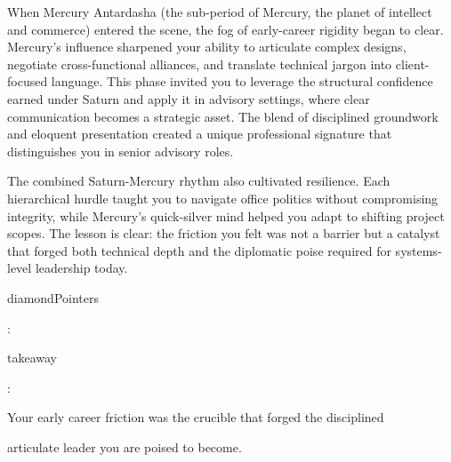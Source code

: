 {\fontsize{9}{13}\selectfont When Mercury Antardasha (the sub-period of Mercury, the planet of intellect and commerce) entered the scene, the fog of early-career rigidity began to clear. Mercury's influence sharpened your ability to articulate complex designs, negotiate cross-functional alliances, and translate technical jargon into client-focused language. This phase invited you to leverage the structural confidence earned under Saturn and apply it in advisory settings, where clear communication becomes a strategic asset. The blend of disciplined groundwork and eloquent presentation created a unique professional signature that distinguishes you in senior advisory roles.}\par\vspace{1.8mm}

{\fontsize{9}{13}\selectfont The combined Saturn-Mercury rhythm also cultivated resilience. Each hierarchical hurdle taught you to navigate office politics without compromising integrity, while Mercury's quick-silver mind helped you adapt to shifting project scopes. The lesson is clear: the friction you felt was not a barrier but a catalyst that forged both technical depth and the diplomatic poise required for systems-level leadership today.}\par\vspace{1.8mm}

{\fontsize{9}{13}\selectfont diamondPointers}\par\vspace{1.8mm}

{\fontsize{9}{13}\selectfont :}\par\vspace{1.8mm}

{\fontsize{9}{13}\selectfont takeaway}\par\vspace{1.8mm}

{\fontsize{9}{13}\selectfont :}\par\vspace{1.8mm}

{\fontsize{9}{13}\selectfont Your early career friction was the crucible that forged the disciplined}\par\vspace{1.8mm}

{\fontsize{9}{13}\selectfont articulate leader you are poised to become.}\par\vspace{1.8mm}

